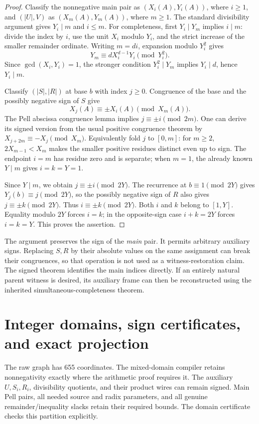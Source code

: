 \documentclass[10pt,letterpaper]{article}
\theoremstyle{remark}\newtheorem{remark}[theorem]{Remark}
\begin{document}
\begin{proof}
Classify the nonnegative main pair as $(X_i(A),Y_i(A))$, where $i\ge1$,
and $(|U|,V)$ as $(X_m(A),Y_m(A))$, where $m\ge1$.
The standard divisibility argument gives $Y_i\mid m$ and $i\le m$.
For completeness, first $Y_i\mid Y_m$ implies $i\mid m$: divide the
index by $i$, use the unit $X_i$ modulo $Y_i$, and the strict increase
of the smaller remainder ordinate. Writing $m=di$, expansion modulo
$Y_i^2$ gives
\[
 Y_m\equiv dX_i^{d-1}Y_i\pmod{Y_i^2}.
\]
Since $\gcd(X_i,Y_i)=1$, the stronger condition $Y_i^2\mid Y_m$
implies $Y_i\mid d$, hence $Y_i\mid m$.

Classify $(|S|,|R|)$ at base $b$ with index $j\ge0$. Congruence of
the base and the possibly negative sign of $S$ give
\[
 X_j(A)\equiv\pm X_i(A)\pmod{X_m(A)}.
\]
The Pell abscissa congruence lemma implies
$j\equiv\pm i\pmod{2m}$. One can derive its signed version from
the usual positive congruence theorem by
$X_{j+2m}\equiv-X_j\pmod{X_m}$. Equivalently fold $j$ to $[0,m]$:
for $m\ge2$, $2X_{m-1}<X_m$ makes the smaller positive residues
distinct even up to sign. The endpoint $i=m$ has residue zero and is
separate; when $m=1$, the already known $Y\mid m$ gives $i=k=Y=1$.

Since $Y\mid m$, we obtain $j\equiv\pm i\pmod{2Y}$.
The recurrence at $b\equiv1\pmod{2Y}$ gives
$Y_j(b)\equiv j\pmod{2Y}$, so the possibly negative sign of $R$
also gives $j\equiv\pm k\pmod{2Y}$.
Thus $i\equiv\pm k\pmod{2Y}$. Both $i$ and $k$ belong to $[1,Y]$.
Equality modulo $2Y$ forces $i=k$; in the opposite-sign case
$i+k=2Y$ forces $i=k=Y$. This proves the assertion.
\end{proof}

The argument preserves the sign of the \emph{main} pair. It permits
arbitrary auxiliary signs. Replacing $S,R$ by their absolute values
on the same assignment can break their congruences, so that operation
is not used as a witness-restoration claim. The signed theorem identifies
the main indices directly. If an entirely natural parent witness is
desired, its auxiliary frame can then be reconstructed using the
inherited simultaneous-completeness theorem.

\section{Integer domains, sign certificates, and exact projection}
\label{sec:integer}

The raw graph has 655 coordinates. The mixed-domain compiler retains
nonnegativity exactly where the arithmetic proof requires it. The
auxiliary $U,S_i,R_i$, divisibility quotients, and their product wires
can remain signed. Main Pell pairs, all needed source and radix
parameters, and all genuine remainder/inequality slacks retain their
required bounds. The domain certificate checks this partition explicitly.
\end{document}
